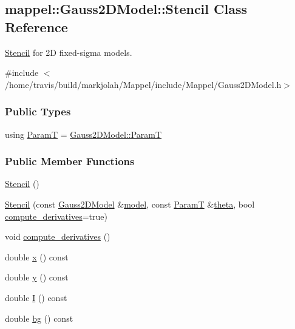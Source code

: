 \hypertarget{classmappel_1_1Gauss2DModel_1_1Stencil}{}\subsection{mappel\+:\+:Gauss2\+D\+Model\+:\+:Stencil Class Reference}
\label{classmappel_1_1Gauss2DModel_1_1Stencil}


\hyperlink{classmappel_1_1Gauss2DModel_1_1Stencil}{Stencil} for 2D fixed-\/sigma models.  




{\ttfamily \#include $<$/home/travis/build/markjolah/\+Mappel/include/\+Mappel/\+Gauss2\+D\+Model.\+h$>$}

\subsubsection*{Public Types}
\begin{DoxyCompactItemize}
\item 
using \hyperlink{classmappel_1_1Gauss2DModel_1_1Stencil_af4899fe2829b3bf1c685cd6bfd1b602e}{ParamT} = \hyperlink{classmappel_1_1PointEmitterModel_a665ec6aea3aac139bb69a23c06d4b9a1}{Gauss2\+D\+Model\+::\+ParamT}
\end{DoxyCompactItemize}
\subsubsection*{Public Member Functions}
\begin{DoxyCompactItemize}
\item 
\hyperlink{classmappel_1_1Gauss2DModel_1_1Stencil_a75a827ef8312a7ce445c83aebf93204f}{Stencil} ()
\item 
\hyperlink{classmappel_1_1Gauss2DModel_1_1Stencil_a9e1f0ff585b5394d2d114a432b8c7d94}{Stencil} (const \hyperlink{classmappel_1_1Gauss2DModel}{Gauss2\+D\+Model} \&\hyperlink{classmappel_1_1Gauss2DModel_1_1Stencil_ac5ae33e358a883887bccedc8a485bca7}{model}, const \hyperlink{classmappel_1_1Gauss2DModel_1_1Stencil_af4899fe2829b3bf1c685cd6bfd1b602e}{ParamT} \&\hyperlink{classmappel_1_1Gauss2DModel_1_1Stencil_ac9ce60b33fe2235ebbb80dd9d90a49ad}{theta}, bool \hyperlink{classmappel_1_1Gauss2DModel_1_1Stencil_aa454ad18859be0dcc48f5de8982c7ba7}{compute\+\_\+derivatives}=true)
\item 
void \hyperlink{classmappel_1_1Gauss2DModel_1_1Stencil_aa454ad18859be0dcc48f5de8982c7ba7}{compute\+\_\+derivatives} ()
\item 
double \hyperlink{classmappel_1_1Gauss2DModel_1_1Stencil_a01755bf64c87675ddd69958e65eb0bc3}{x} () const 
\item 
double \hyperlink{classmappel_1_1Gauss2DModel_1_1Stencil_a3c130702adb8ce884c35eef9bb4d510f}{y} () const 
\item 
double \hyperlink{classmappel_1_1Gauss2DModel_1_1Stencil_aac7254dbe4ed3e2dd928ab29779f570d}{I} () const 
\item 
double \hyperlink{classmappel_1_1Gauss2DModel_1_1Stencil_a1e6bea9d029ad5ff367e988a5af24101}{bg} () const 
\end{DoxyCompactItemize}
